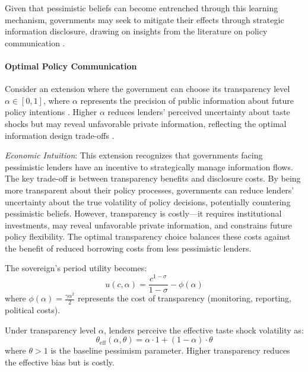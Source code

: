 \documentclass[12pt]{article}
\theoremstyle{plain}
\begin{document}
Given that pessimistic beliefs can become entrenched through this learning
mechanism, governments may seek to mitigate their effects through strategic
information disclosure, drawing on insights from the literature on policy
communication \citep{BlinderEhrmannFratzscher2008}.

\paragraph{Optimal Policy Communication}

Consider an extension where the government can choose its transparency level
$\alpha \in [0,1]$, where $\alpha$ represents the precision of public
information about future policy intentions \citep{MorrisShin2002}. Higher
$\alpha$ reduces lenders' perceived uncertainty about taste shocks but may
reveal unfavorable private information, reflecting the optimal information
design trade-offs \citep{AngelosetsPavan2007}.

\textit{Economic Intuition}: This extension recognizes that governments facing pessimistic lenders have an incentive to strategically manage information flows. The key trade-off is between transparency benefits and disclosure costs. By being more transparent about their policy processes, governments can reduce lenders' uncertainty about the true volatility of policy decisions, potentially countering pessimistic beliefs. However, transparency is costly---it requires institutional investments, may reveal unfavorable private information, and constrains future policy flexibility. The optimal transparency choice balances these costs against the benefit of reduced borrowing costs from less pessimistic lenders.

The sovereign's period utility becomes:
\begin{equation}
	u(c,\alpha) = \frac{c^{1-\sigma}}{1-\sigma} - \phi(\alpha) \label{eq:utility_communication}
\end{equation}
where $\phi(\alpha) = \frac{\gamma \alpha^2}{2}$ represents the cost of transparency (monitoring, reporting, political costs).

Under transparency level $\alpha$, lenders perceive the effective taste shock
volatility as:
\begin{equation}
	\theta_{\text{eff}}(\alpha, \theta) = \alpha \cdot 1 + (1-\alpha) \cdot \theta \label{eq:effective_theta}
\end{equation}
where $\theta > 1$ is the baseline pessimism parameter. Higher transparency reduces the effective bias but is costly.
\end{document}
